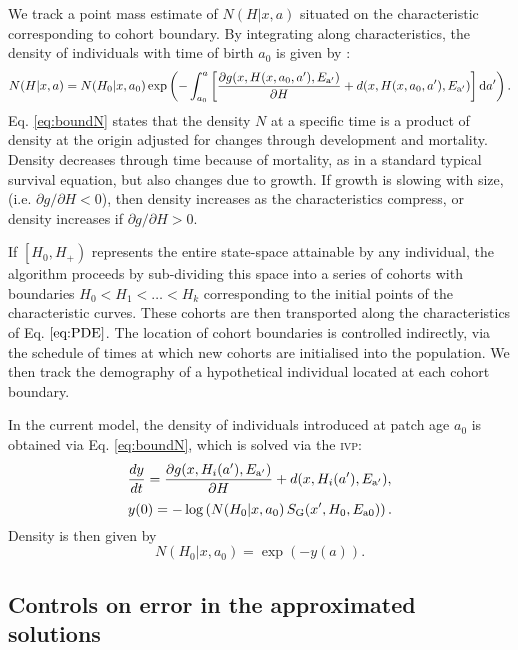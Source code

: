 \documentclass[10pt,twoside]{article}
\begin{document}
We
track a point mass estimate of \(N(H | x, a)\) situated on the characteristic
corresponding to cohort boundary. By integrating along characteristics,
the density of individuals with time of birth \(a_{0}\) is given by
\citep{Deroos-1997}:
\begin{equation}\label{eq:boundN}
  N(H | x, a) = N(H_0 | x, a_0)
   \exp \left( - \int _{a_0}^{a} \left[\frac{\partial g(x, H(x, a_0, a^\prime), E_{\rm a^\prime})}{\partial H} + d(x, H(x, a_0, a^\prime), E_{\rm a^\prime})\right] {\rm d} a^\prime \right).
\end{equation}
Eq. \ref{eq:boundN} states that the density \(N\) at a specific time is
a product of density at the origin adjusted for changes through
development and mortality. Density decreases through time because of
mortality, as in a standard typical survival equation, but also changes
due to growth. If growth is slowing with size, (i.e.
\(\partial g / \partial H < 0\)), then density increases as the
characteristics compress, or density increases if
\(\partial g / \partial H > 0\).

If \(\left[H_0, H_{ + } \right)\) represents the entire state-space
attainable by any individual, the algorithm proceeds by sub-dividing
this space into a series of cohorts with boundaries
\(H_0 < H_1 < \ldots < H_k\) corresponding to the initial points of the characteristic curves. These cohorts are then transported along
the characteristics of Eq. \(\ref{eq:PDE}\). The location of cohort
boundaries is controlled indirectly, via the schedule of times at which
new cohorts are initialised into the population. We then track the
demography of a hypothetical individual located at each cohort boundary.

In the current model, the density of individuals introduced at patch age
\(a_0\) is obtained via Eq.
\ref{eq:boundN}, which is solved via the \textsc{ivp}:
\[\frac{dy}{dt} = \frac{\partial g(x, H_i(a^\prime), E_{\rm a^\prime})}{\partial H} + d(x, H_i(a^\prime), E_{\rm a^\prime}),\]
\[ y(0) = - \log\left(N(H_0 | x, a_0) \, S_{\rm G} (x^\prime, H_0, E_{{\rm a}0}) \right).\]
Density is then given by \[N(H_0 | x, a_0) = \exp( - y(a)).\]

\subsection{Controls on error in the approximated solutions}
\end{document}
